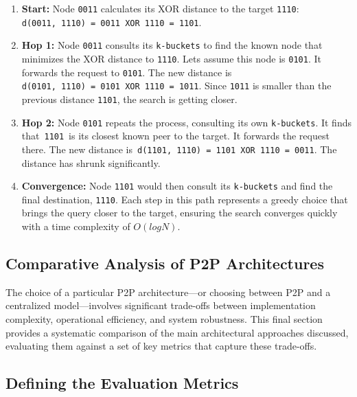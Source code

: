 \documentclass{scrbook}
\begin{document}
\begin{enumerate}
    \item
    \textbf{Start:} Node \texttt{0011} calculates its XOR distance to the target \texttt{1110}: \texttt{d(0011,\ 1110)\ =\ 0011\ XOR\ 1110\ =\ 1101}.

    \item 
    \textbf{Hop 1:} Node \texttt{0011} consults
    its \texttt{k-buckets} to find the known node that minimizes the XOR distance to \texttt{1110}. Let\textquotesingle s assume this node
    is \texttt{0101}. It forwards the request to \texttt{0101}. The new
    distance is \texttt{d(0101,\ 1110)\ =\ 0101\ XOR\ 1110\ =\ 1011}.
    Since \texttt{1011} is smaller than the previous distance \texttt{1101}, the search is getting closer.
    
    \item
    \textbf{Hop 2:} Node \texttt{0101} repeats the process, consulting its own \texttt{k-buckets}. It finds that~\texttt{1101}~is
    its closest known peer to the target. It forwards the request there. The
    new distance is~\texttt{d(1101,\ 1110)\ =\ 1101\ XOR\ 1110\ =\ 0011}.
    The distance has shrunk significantly.

    \item \textbf{Convergence:} Node \texttt{1101} would then consult its \texttt{k-buckets} and find the final destination, \texttt{1110}.
    Each step in this path represents a greedy choice that brings the query
    closer to the target, ensuring the search converges quickly with a time
    complexity of $O(log N)$.
\end{enumerate}

\subsection{Comparative Analysis of P2P Architectures}

The choice of a particular P2P architecture---or choosing between P2P
and a centralized model---involves significant trade-offs between
implementation complexity, operational efficiency, and system
robustness. This final section provides a systematic comparison of the
main architectural approaches discussed, evaluating them against a set
of key metrics that capture these trade-offs.

\subsection{Defining the Evaluation Metrics}
\end{document}
